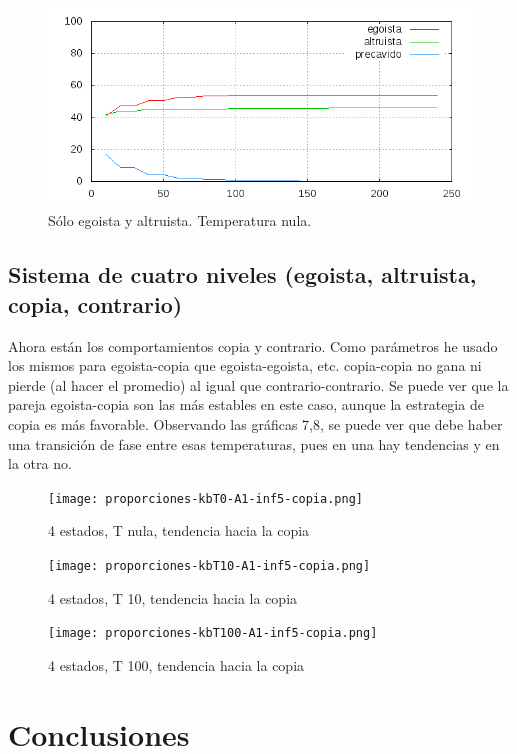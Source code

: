 \documentclass[a4paper,10pt,twocolumn]{article}
\begin{document}
\begin{figure}
\includegraphics[scale=0.4]{p-0-1-0-2estados.png}
\caption{S\'olo egoista y altruista. Temperatura nula.}
\end{figure}


\subsection*{Sistema de cuatro niveles (egoista, altruista, copia, contrario)}

Ahora est\'an los comportamientos copia y contrario. Como par\'ametros he usado los mismos para egoista-copia que egoista-egoista, etc. copia-copia no gana ni pierde (al hacer el promedio) al igual que contrario-contrario. Se puede ver que la pareja egoista-copia son las m\'as estables en este caso, aunque la estrategia de copia es m\'as favorable. Observando las gr\'aficas 7,8, se puede ver que debe haber una transici\'on de fase entre esas temperaturas, pues en una hay tendencias y en la otra no. 

\begin{figure}
\texttt{[image: proporciones-kbT0-A1-inf5-copia.png]}
\caption{4 estados, T nula, tendencia hacia la copia}
\end{figure}

\begin{figure}
\texttt{[image: proporciones-kbT10-A1-inf5-copia.png]}
\caption{4 estados, T 10, tendencia hacia la copia}
\end{figure}

\begin{figure}
\texttt{[image: proporciones-kbT100-A1-inf5-copia.png]}
\caption{4 estados, T 100, tendencia hacia la copia}
\end{figure}

\section*{Conclusiones}
\end{document}
